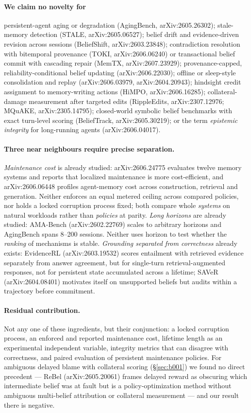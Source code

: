 \documentclass[11pt]{article}
\begin{document}
\paragraph{We claim no novelty for} persistent-agent aging or degradation
(AgingBench, arXiv:2605.26302); stale-memory detection (STALE, arXiv:2605.06527);
belief drift and evidence-driven revision across sessions (BeliefShift,
arXiv:2603.23848); contradiction resolution with bitemporal provenance (TOKI,
arXiv:2606.06240) or transactional belief commit with cascading repair (MemTX,
arXiv:2607.23929); provenance-capped, reliability-conditional belief updating
(arXiv:2606.22030); offline or sleep-style consolidation and replay
(arXiv:2606.03979, arXiv:2604.20943); hindsight credit assignment to
memory-writing actions (HiMPO, arXiv:2606.16285); collateral-damage measurement
after targeted edits (RippleEdits, arXiv:2307.12976; MQuAKE, arXiv:2305.14795);
closed-world symbolic belief benchmarks with exact turn-level scoring
(BeliefTrack, arXiv:2605.30219); or the term \emph{epistemic integrity} for
long-running agents (arXiv:2606.04017).

\paragraph{Three near neighbours require precise separation.}
\emph{Maintenance cost} is already studied: arXiv:2606.24775 evaluates twelve
memory systems and reports that localized maintenance is more cost-efficient,
and arXiv:2606.06448 profiles agent-memory cost across construction, retrieval
and generation. Neither enforces an equal metered ceiling across compared
policies, nor holds a locked corruption process fixed; both compare whole
\emph{systems} on natural workloads rather than \emph{policies} at parity.
\emph{Long horizons} are already studied: AMA-Bench (arXiv:2602.22769) scales to
arbitrary horizons and AgingBench spans 8--200 sessions. Neither uses horizon to
test whether the \emph{ranking} of mechanisms is stable. \emph{Grounding
separated from correctness} already exists: EvidenceRL (arXiv:2603.19532) scores
entailment with retrieved evidence separately from answer agreement, but for
single-turn retrieval-augmented responses, not for persistent state accumulated
across a lifetime; SAVeR (arXiv:2604.08401) motivates itself on unsupported
beliefs but audits within a trajectory before commitment.

\paragraph{Residual contribution.} Not any one of these ingredients, but their
conjunction: a locked corruption process, an enforced and reported maintenance
cost, lifetime length as an experimental independent variable, integrity metrics
that can disagree with correctness, and paired evaluation of persistent
maintenance policies. For ambiguous delayed blame with collateral scoring
(\S\ref{sec:b001}) we found no direct precedent --- ReBel (arXiv:2605.20061)
frames delayed reward as obscuring which intermediate belief was at fault but is
a policy-optimization method without ambiguous multi-belief attribution or
collateral measurement --- and our result there is negative.
\end{document}
